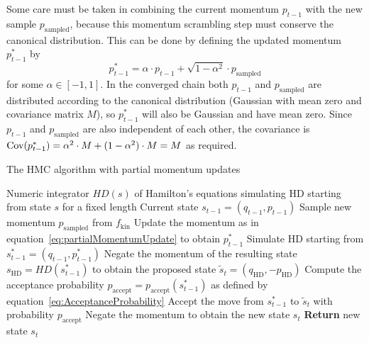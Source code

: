 Some care must be taken in combining the current momentum $p_{t-1}$ with the new sample $p_\textrm{sampled}$, because this momentum scrambling step must conserve the canonical distribution. This can be done by defining the updated momentum $p^*_{t-1}$ by
\begin{equation} \label{eq:partialMomentumUpdate}
p^*_{t-1} = \alpha \cdot p_{t-1} + \sqrt{1 - \alpha ^2} \cdot p_\textrm{sampled}
\end{equation}
for some $\alpha \in [-1, 1]$. In the converged chain both $p_{t-1}$ and $p_\textrm{sampled}$ are distributed according to the canonical distribution (Gaussian with mean zero and covariance matrix $M$), so $p^*_{t-1}$ will also be Gaussian and have mean zero. Since $p_{t-1}$ and $p_\textrm{sampled}$ are also independent of each other, the covariance is $\mathrm{Cov}(p^*_{t-1}) = \alpha^2 \cdot M + (1 - \alpha ^2) \cdot M = M$ as required.

\begin{algorithm}
\caption{The HMC algorithm with partial momentum updates}\label{alg:HMCWithPartial}
\begin{algorithmic}[1]
\Require Numeric integrator $HD(s)$ of Hamilton's equations simulating HD starting from state $s$ for a fixed length
\Require Current state $s_{t-1} = (q_{t-1}, p_{t-1})$
\State Sample new momentum $p_\textrm{sampled}$ from $f_\textrm{kin}$
\State Update the momentum as in equation~\eqref{eq:partialMomentumUpdate} to obtain $p^*_{t-1}$
\State Simulate HD starting from $s^*_{t-1} = (q_{t-1}, p^*_{t-1})$
\State Negate the momentum of the resulting state $s_\textrm{HD} = HD(s^*_{t-1})$ to obtain the proposed state $\tilde{s}_t = (q_\textrm{HD}, - p_\textrm{HD})$
\State Compute the acceptance probability $p_\textrm{accept}=p_\textrm{accept}(s^*_{t-1})$ as defined by equation~\eqref{eq:AcceptanceProbability}
\State Accept the move from $s^*_{t-1}$ to $\tilde{s}_t$ with probability $p_\textrm{accept}$
\State Negate the momentum to obtain the new state $s_t$
\State \textbf{Return} new state $s_t$
\end{algorithmic}
\end{algorithm}

